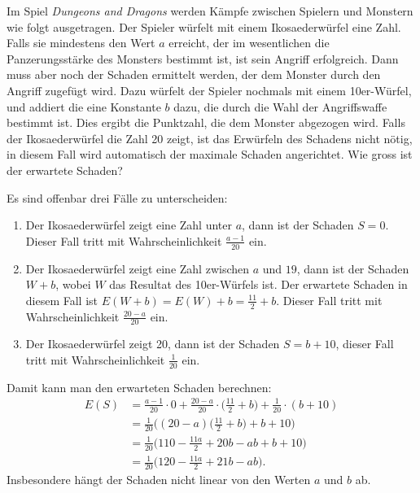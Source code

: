 Im Spiel {\it Dungeons and Dragons} werden Kämpfe zwischen Spielern und
Monstern wie folgt ausgetragen.
Der Spieler würfelt mit einem Ikosaederwürfel eine Zahl.
Falls sie mindestens den Wert
$a$ erreicht, der im wesentlichen die Panzerungsstärke
des Monsters bestimmt ist, ist sein Angriff erfolgreich. Dann muss aber noch der
Schaden ermittelt werden, der dem Monster durch den Angriff zugefügt wird.
Dazu würfelt der Spieler nochmals mit einem 10er-Würfel, und addiert die
eine Konstante $b$ dazu, die durch die Wahl der Angriffswaffe bestimmt ist.
Dies ergibt die Punktzahl, die dem Monster abgezogen wird.
Falls der Ikosaederwürfel die Zahl 20 zeigt, ist das Erwürfeln des
Schadens nicht nötig, in diesem Fall wird automatisch der maximale
Schaden angerichtet. Wie gross ist der erwartete Schaden?


\begin{loesung}
Es sind offenbar drei Fälle zu unterscheiden:
\begin{enumerate}
\item Der Ikosaederwürfel zeigt eine Zahl unter $a$, dann ist der Schaden
$S=0$. Dieser Fall tritt mit Wahrscheinlichkeit $\frac{a-1}{20}$ ein.
\item Der Ikosaederwürfel zeigt eine Zahl zwischen $a$ und $19$,
dann ist der Schaden $W+b$, wobei $W$ das Resultat des 10er-Würfels ist.
Der erwartete Schaden in diesem Fall ist $E(W+b)=E(W)+b=\frac{11}2 + b$.
Dieser Fall tritt mit Wahrscheinlichkeit $\frac{20-a}{20}$ ein.
\item Der Ikosaederwürfel zeigt 20, dann ist der Schaden $S=b + 10$,
dieser Fall tritt mit Wahrscheinlichkeit $\frac1{20}$ ein.
\end{enumerate}
Damit kann man den erwarteten Schaden berechnen:
\begin{align*}
E(S)&=\frac{a-1}{20}\cdot 0 + \frac{20-a}{20}\cdot \biggl(\frac{11}2+b\biggr)
+\frac1{20}\cdot (b+10)
\\
&=
\frac1{20}\biggl(
(20-a)\biggl(\frac{11}2+b\biggr)+b+10
\biggr)
\\
&=
\frac1{20}\biggl(
110 -\frac{11a}2+20b-ab + b + 10
\biggr)
\\
&=
\frac1{20}\biggl(
120 -\frac{11a}2+21b-ab
\biggr).
\end{align*}
Insbesondere hängt der Schaden nicht linear von den Werten $a$ und $b$ ab.
\end{loesung}
